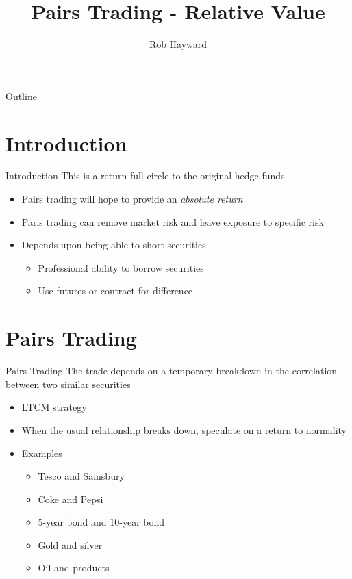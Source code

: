 \documentclass[14pt,xcolor=pdftex,dvipsnames,table]{beamer}\usepackage[]{graphicx}\usepackage[]{color}
\title{Pairs Trading - Relative Value}
\author{Rob Hayward}
\begin{document}
\begin{frame}
\titlepage
\end{frame}

\begin{frame}{Outline}
\tableofcontents
\end{frame}

\section{Introduction}
\begin{frame}{Introduction}
This is a return full circle to the original hedge funds
\pause
\begin{itemize}[<+-| alert@+>]
\item Pairs trading will hope to provide an \emph{absolute return}
\item Paris trading can remove market risk and leave exposure to specific risk
\item Depends upon being able to short securities
\begin{itemize}
\item Professional ability to borrow securities
\item Use futures or contract-for-difference
\end{itemize}
\end{itemize}
\end{frame}

\section{Pairs Trading}
\begin{frame}{Pairs Trading}
The trade depends on a temporary breakdown in the correlation between two similar securities
\pause
\begin{itemize}[<+-| alert@+>]
\item LTCM strategy
\item When the usual relationship breaks down, speculate on a return to normality
\item Examples
\begin{itemize}
\item Tesco and Sainsbury
\item Coke and Pepsi
\item 5-year bond and 10-year bond
\item Gold and silver
\item Oil and products
\end{itemize}
\end{itemize}
\end{frame}
\end{document}
